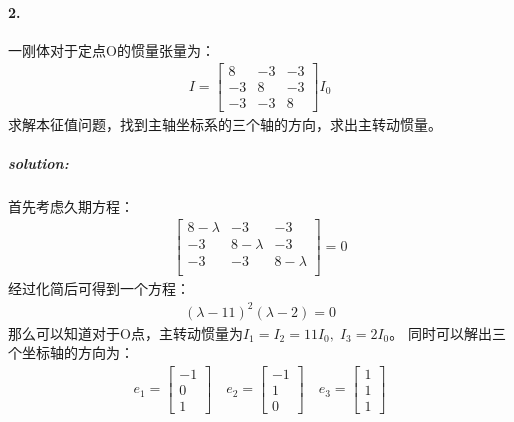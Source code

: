 \documentclass[a4paper]{ctexart}
\begin{document}
    \paragraph{2.}一刚体对于定点O的惯量张量为：
    \begin{gather}
        I = 
        \begin{bmatrix}
            8 & -3 & -3\\
            -3 & 8 & -3\\
            -3 & -3 & 8
        \end{bmatrix}
        I_{0}
    \end{gather}
    求解本征值问题，找到主轴坐标系的三个轴的方向，求出主转动惯量。
    \subparagraph{solution:}
    首先考虑久期方程：
    \begin{gather}
        \begin{bmatrix}
            8 - \lambda & -3 & -3\\
            -3 & 8 - \lambda & -3\\
            -3 & -3 & 8 - \lambda\\
        \end{bmatrix}
        = 0
    \end{gather}
    经过化简后可得到一个方程：
    \begin{align}
        (\lambda - 11)^{2}(\lambda - 2) = 0
    \end{align}
    那么可以知道对于O点，主转动惯量为$I_{1} = I_{2} = 11I_{0},\;I_{3} = 2I_{0}$。
    同时可以解出三个坐标轴的方向为：
    \begin{gather}
    e_{1} = 
    \begin{bmatrix}
        -1\\
        0\\
        1
    \end{bmatrix}
    \quad
    e_{2} = 
    \begin{bmatrix}
        -1\\
        1\\
        0
    \end{bmatrix}
    \quad
    e_{3} = 
    \begin{bmatrix}
        1\\
        1\\
        1
    \end{bmatrix}
    \end{gather}
    \\
\end{document}
